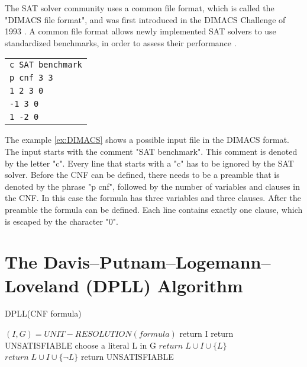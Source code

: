 The SAT solver community uses a common file format, which is called the "DIMACS file format", and was first introduced in the DIMACS Challenge of 1993 \cite{johnson1996cliques}. A common file format allows newly implemented SAT solvers to use standardized benchmarks, in order to assess their performance \cite{biere2009handbook}.

\begin{center}
\begin{leftbar}
\begin{tabular}{l}
\texttt{c SAT benchmark} \\
\texttt{p cnf 3 3} \\
\texttt{1 2 3 0} \\
\texttt{-1 3 0} \\
\texttt{1 -2 0}\\
\end{tabular}
\end{leftbar}
\label{ex:DIMACS}
\end{center}
The example \ref{ex:DIMACS} shows a possible input file in the DIMACS format. The input starts with the comment "SAT benchmark". This comment is denoted by the letter "c". Every line that starts with a "c" has to be ignored by the SAT solver. Before the CNF can be defined, there needs to be a preamble that is denoted by the phrase "p cnf", followed by the number of variables and clauses in the CNF. In this case the formula has three variables and three clauses. After the preamble the formula can be defined. Each line contains exactly one clause, which is escaped by the character "0". \cite{biere2009handbook}

\section{The Davis–Putnam–Logemann–Loveland (DPLL) Algorithm}
\label{sec:dpll}

\begin{algorithm}
\caption{DPLL(CNF formula) \cite{biere2009handbook}}\label{alg:DPLL}
\begin{algorithmic}
\State $(I,G) = UNIT-RESOLUTION(formula)$
	\State return I
    \State return UNSATISFIABLE
\Else
	\State choose a literal L in G
		\State $return \; L \cup I \cup \{L\}$
		\State $return \; L \cup I \cup \{\neg L\}$
	\Else
		\State return UNSATISFIABLE
	\EndIf
\EndIf
\end{algorithmic}
\end{algorithm}


